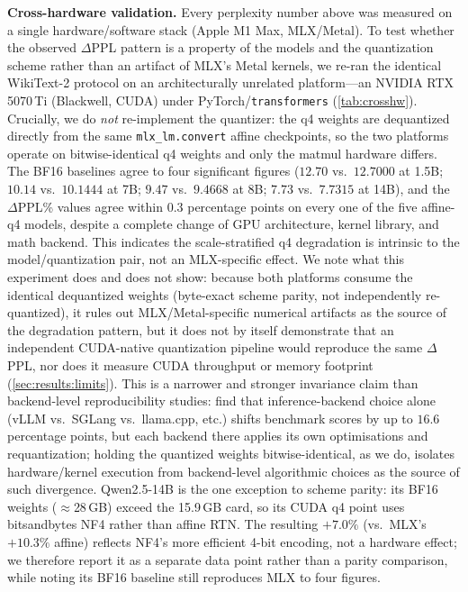 \documentclass[10pt,twocolumn]{article}
\begin{document}
\textbf{Cross-hardware validation.}  Every perplexity number above was measured
on a single hardware/software stack (Apple M1 Max, MLX/Metal).  To test whether
the observed $\Delta$PPL pattern is a property of the models and the quantization
scheme rather than an artifact of MLX's Metal kernels, we re-ran the identical
WikiText-2 protocol on an architecturally unrelated platform---an NVIDIA RTX
5070\,Ti (Blackwell, CUDA) under PyTorch/\texttt{transformers}
(\cref{tab:crosshw}).  Crucially, we do \emph{not} re-implement the quantizer:
the q4 weights are dequantized directly from the same \texttt{mlx\_lm.convert}
affine checkpoints, so the two platforms operate on bitwise-identical q4 weights
and only the matmul hardware differs.  The BF16 baselines agree to four
significant figures ($12.70$ vs.\ $12.7000$ at 1.5B; $10.14$ vs.\ $10.1444$ at
7B; $9.47$ vs.\ $9.4668$ at 8B; $7.73$ vs.\ $7.7315$ at 14B), and the
$\Delta$PPL\% values agree within $0.3$ percentage points on every one of the
five affine-q4 models, despite a complete change of
GPU architecture, kernel library, and math backend.  This indicates the
scale-stratified q4 degradation is intrinsic to the model/quantization pair, not
an MLX-specific effect.  We note what this experiment does and does not show:
because both platforms consume the identical dequantized weights (byte-exact
scheme parity, not independently re-quantized), it rules out MLX/Metal-specific
numerical artifacts as the source of the degradation pattern, but it does not
by itself demonstrate that an independent CUDA-native quantization pipeline
would reproduce the same $\Delta$PPL, nor does it measure CUDA throughput or
memory footprint (\cref{sec:results:limits}).  This is a narrower and
stronger invariance claim than backend-level reproducibility studies:
\citet{pape2026silent} find that inference-backend choice alone (vLLM vs.\
SGLang vs.\ llama.cpp, etc.) shifts benchmark scores by up to $16.6$
percentage points, but each backend there applies its own optimisations and
requantization; holding the quantized weights bitwise-identical, as we do,
isolates hardware/kernel execution from backend-level algorithmic choices as
the source of such divergence.  Qwen2.5-14B is the one exception to scheme parity: its
BF16 weights ($\approx$28\,GB) exceed the 15.9\,GB card, so its CUDA q4 point
uses bitsandbytes NF4 rather than affine RTN.  The resulting $+7.0\%$ (vs.\ MLX's
$+10.3\%$ affine) reflects NF4's more efficient 4-bit encoding, not a hardware
effect; we therefore report it as a separate data point rather than a parity
comparison, while noting its BF16 baseline still reproduces MLX to four figures.
\end{document}
